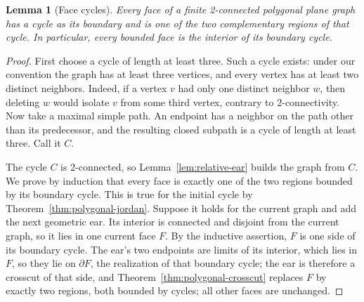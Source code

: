 \documentclass[11pt]{article}
\theoremstyle{mainplain}
\newtheorem{lemma}[theorem]{Lemma}
\theoremstyle{mainroman}
\theoremstyle{definition}
\numberwithin{equation}{section}
\begin{document}
\begin{lemma}[Face cycles]\label{lem:face-cycles}
Every face of a finite 2-connected polygonal plane graph has a cycle
as its boundary and is one of the two complementary regions of that
cycle. In particular, every bounded face is the interior of its
boundary cycle.
\end{lemma}
\begin{proof}
First choose a cycle of length at least three. Such a cycle exists:
under our convention the graph has at least three vertices, and every
vertex has at least two distinct neighbors. Indeed, if a vertex $v$ had
only one distinct neighbor $w$, then deleting $w$ would isolate $v$
from some third vertex, contrary to 2-connectivity. Now take a maximal
simple path. An endpoint has a neighbor on the path other than its
predecessor, and the resulting closed subpath is a cycle of length at
least three. Call it $C$.

The cycle $C$ is 2-connected, so Lemma~\ref{lem:relative-ear} builds the
graph from $C$. We prove by induction that every face is exactly one
of the two regions bounded by its boundary cycle. This is true for the initial
cycle by Theorem~\ref{thm:polygonal-jordan}. Suppose it holds for the current
graph and add the next geometric ear. Its interior is connected and
disjoint from the current graph, so it lies in one current face $F$.
By the inductive assertion, $F$ is one side of its boundary cycle. The
ear's two endpoints are limits of its interior, which lies in $F$, so
they lie on $\partial F$, the realization of that boundary cycle; the
ear is therefore a crosscut of that side, and
Theorem~\ref{thm:polygonal-crosscut} replaces $F$ by exactly two regions,
both bounded by cycles; all other faces are unchanged.
\end{proof}
\end{document}
